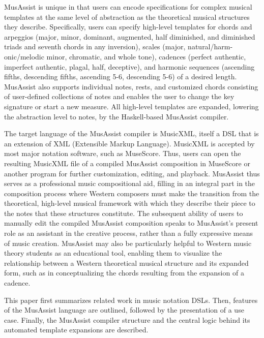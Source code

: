 \documentclass{article}
\begin{document}
MusAssist is unique in that users can encode specifications for complex musical templates at the same level of abstraction as the theoretical musical structures they describe. Specifically, users can specify high-level templates for 
chords and arpeggios (major, minor, dominant, augmented, half diminished, and diminished triads and seventh chords in any inversion), 
scales (major, natural/harm-onic/melodic minor, chromatic, and whole tone), 
cadences (perfect authentic, imperfect authentic, plagal, half, deceptive), and 
harmonic sequences (ascending fifths, descending fifths, ascending 5-6, descending 5-6) of a desired length. MusAssist also supports individual notes, rests, and customized chords consisting of user-defined collections of notes and enables the user to change the key signature or start a new measure. All high-level templates are expanded, lowering the abstraction level to notes, by the Haskell-based MusAssist compiler.

The target language of the MusAssist compiler is MusicXML, itself a DSL that is an extension of XML (Extensible Markup Language). MusicXML is accepted by most major notation software, such as MuseScore. Thus, users can open the resulting MusicXML file of a compiled MusAssist composition in MuseScore or another program for further customization, editing, and playback. MusAssist thus serves as a professional music compositional aid, filling in an integral part in the composition process where Western composers must make the transition from the theoretical, high-level musical framework with which they describe their piece to the notes that these structures constitute. The subsequent ability of users to manually edit the compiled MusAssist composition speaks to MusAssist's present role as an assistant in the creative process, rather than a fully expressive means of music creation. MusAssist may also be particularly helpful to Western music theory students as an educational tool, enabling them to visualize the relationship between a Western theoretical musical structure and its expanded form, such as in conceptualizing the chords resulting from the expansion of a cadence. 

This paper first summarizes related work in music notation DSLs. Then, features of the MusAssist language are outlined, followed by the presentation of a use case. Finally, the MusAssist compiler structure and the central logic behind its automated template expansions are described. 


\end{document}
